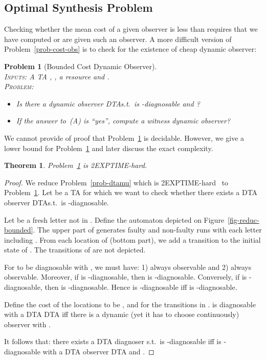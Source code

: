 \documentclass[letterpaper,10pt,conference]{ieeeconf}  \IEEEoverridecommandlockouts                              \overrideIEEEmargins
\def\st{{s.t.}~}
\newtheorem{prob}{Problem}  \newtheorem{definition}{Definition}
\newtheorem{theorem}{Theorem}
\def\dtamu{DTA\xspace}
\begin{document}
\subsection{Optimal Synthesis Problem}
Checking whether the mean cost of a given observer is less than 
requires that we have computed or are given such an observer.  A more
difficult version of Problem~\ref{prob-cost-obs} is to check for the
existence of cheap dynamic observer:
\begin{prob}[Bounded Cost Dynamic Observer] \label{prob-bounded-cost} \mbox{} \\
  \textsc{Inputs:} A TA ,
  ,
   a resource and . \\
  \textsc{Problem:}
  \begin{itemize}
  \item[(A)] Is there a dynamic observer  \dtamu \st  is
    -diagnosable and  ?
  \item[(B)] If the answer to~(A) is ``yes'', compute a witness
    dynamic observer?
  \end{itemize}
\end{prob}
We cannot provide of proof that Problem~\ref{prob-bounded-cost} is
decidable.  However, we give a lower bound for
Problem~\ref{prob-bounded-cost} and later discuss the exact
complexity.
\begin{theorem}
  Problem~\ref{prob-bounded-cost} is 2EXPTIME-hard.
\end{theorem}
\begin{proof}
  We reduce Problem~\ref{prob-dtamu} which is
  2EXPTIME-hard~\cite{Bouyerfossacs05} to Problem~\ref{prob-bounded-cost}.
  Let  be a TA for which we want to check whether there exists a
  DTA observer  \dtamu \st  is -diagnosable.

  Let  be a fresh letter not in .  Define the
  automaton  depicted on Figure~\ref{fig-reduc-bounded}.  The
  upper part of  generates faulty and non-faulty runs with each
  letter including .  From each location of  (bottom part),
  we add a  transition to the initial state of .  The
  transitions of  are not depicted.
  
  For  to be diagnosable with , we must have: 1)
   always observable and 2)  always observable.
  Moreover, if  is -diagnosable, then  is
  -diagnosable. Conversely, if  is
  -diagnosable, then  is
  -diagnosable.  Hence  is
  -diagnosable iff  is
  -diagnosable.

  Define the cost of the locations to be , and  for the
  transitions in .   is diagnosable with a DTA  \dtamu
  iff there is a dynamic (yet it has to choose 
  continuously) observer  with .
  
  It follows that: there exists a \dtamu diagnoser  \st  is
  -diagnosable iff  is -diagnosable
  with a DTA observer  \dtamu and .
\end{proof}
\end{document}
